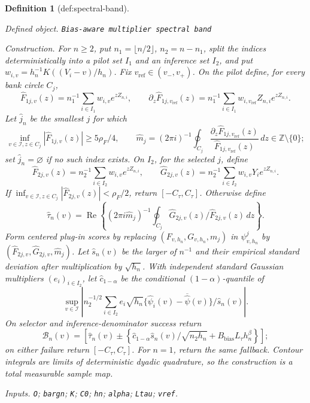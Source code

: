\documentclass{article}
\newtheorem{definition}{Definition}
\begin{document}
\begin{definition}[def:spectral-band]\label{def:spectral-band}
\par\smallskip\noindent\emph{Defined object.} \texttt{Bias-\allowbreak{}aware multiplier spectral band}
\par\smallskip\noindent\emph{Construction.} For \(n\ge2\), put \(n_1=\lfloor n/2\rfloor\), \(n_2=n-n_1\), split the indices deterministically into a pilot set \(I_1\) and an inference set \(I_2\), and put \(w_{i,v}=h_n^{-1}K((V_i-v)/h_n)\). Fix \(v_{\mathrm{ref}}\in(v_-,v_+)\). On the pilot define, for every bank circle \(C_j\),
\[
 \widehat F_{1j,v}(z)=n_1^{-1}\sum_{i\in I_1}w_{i,v}e^{zZ_{n,i}},\qquad
 \partial_z\widehat F_{1j,v_{\mathrm{ref}}}(z)
 =n_1^{-1}\sum_{i\in I_1}w_{i,v_{\mathrm{ref}}}Z_{n,i}e^{zZ_{n,i}}.
\]
Let \(\widehat j_n\) be the smallest \(j\) for which
\[
 \inf_{v\in\mathcal I,z\in C_j}|\widehat F_{1j,v}(z)|
 \ge5\rho_F/4,
 \qquad
 \widehat m_j=(2\pi i)^{-1}\oint_{C_j}
 \frac{\partial_z\widehat F_{1j,v_{\mathrm{ref}}}(z)}
 {\widehat F_{1j,v_{\mathrm{ref}}}(z)}\,dz
 \in\mathbb Z\setminus\{0\};
\]
set \(\widehat j_n=\varnothing\) if no such index exists. On \(I_2\), for the selected \(j\), define
\[
 \widehat F_{2j,v}(z)=n_2^{-1}\sum_{i\in I_2}w_{i,v}e^{zZ_{n,i}},\qquad
 \widehat G_{2j,v}(z)=n_2^{-1}\sum_{i\in I_2}w_{i,v}Y_i e^{zZ_{n,i}}.
\]
If \(\inf_{v\in\mathcal I,z\in C_j}|\widehat F_{2j,v}(z)|<\rho_F/2\), return \([-C_\tau,C_\tau]\). Otherwise define
\[
 \widehat\tau_n(v)=\operatorname{Re}\left\{(2\pi i\widehat m_j)^{-1}
 \oint_{C_j}\widehat G_{2j,v}(z)/\widehat F_{2j,v}(z)\,dz\right\}.
\]
Form centered plug-in scores by replacing \((F_{v,h_n},G_{v,h_n},m_j)\) in \(\psi^j_{v,h_n}\) by \((\widehat F_{2j,v},\widehat G_{2j,v},\widehat m_j)\). Let \(\widehat s_n(v)\) be the larger of \(n^{-1}\) and their empirical standard deviation after multiplication by \(\sqrt{h_n}\). With independent standard Gaussian multipliers \((e_i)_{i\in I_2}\), let \(\widehat c_{1-\alpha}\) be the conditional \((1-\alpha)\)-quantile of
\[
 \sup_{v\in\mathcal I}\left|n_2^{-1/2}\sum_{i\in I_2}e_i\sqrt{h_n}
 \{\widehat\psi_i(v)-\overline{\widehat\psi}(v)\}/\widehat s_n(v)\right|.
\]
On selector and inference-denominator success return
\[
 \mathcal B_n(v)=\left[\widehat\tau_n(v)\pm
 \left\{\widehat c_{1-\alpha}\widehat s_n(v)/\sqrt{n_2h_n}
 +B_{\mathrm{bias}}L_\tau h_n^\beta\right\}\right];
\]
on either failure return \([-C_\tau,C_\tau]\). For \(n=1\), return the same fallback. Contour integrals are limits of deterministic dyadic quadrature, so the construction is a total measurable sample map.
\par\smallskip\noindent\emph{Inputs.} \texttt{O}; \texttt{bargn}; \texttt{K}; \texttt{C0}; \texttt{hn}; \texttt{alpha}; \texttt{Ltau}; \texttt{vref}.
\end{definition}
\end{document}

